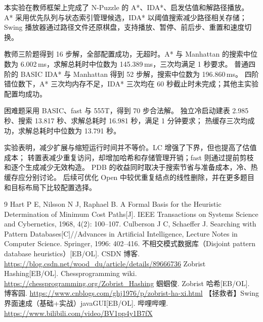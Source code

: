 \endgroup
\vspace{6bp}

\par\vspace{6bp}
\begingroup
\setlength{\parskip}{3bp}

本实验在教师框架上完成了 N-Puzzle 的 A*、IDA*、启发估值和解路径播放。
A* 采用优先队列与状态索引管理候选，IDA* 以阈值搜索减少路径相关存储；
Swing 播放器通过路径文件还原棋盘，支持播放、暂停、前后步、重置和速度切换。

教师三阶题得到 16 步解，全部配置成功，无超时。A* 与 Manhattan 的搜索中位数为
6.002\,ms，求解总耗时中位数为 145.389\,ms，三次均满足 1 秒要求。
普通四阶的 BASIC IDA* 与 Manhattan 得到 52 步解，搜索中位数为 196.860\,ms。
四阶错位数下，A* 三次均内存不足，IDA* 三次均在 60 秒截止时未完成；其他主实验配置均成功。

困难题采用 BASIC、fast 与 555T，得到 70 步合法解。
独立冷启动建表 2.985 秒、搜索 13.817 秒、求解总耗时 16.981 秒，满足 1 分钟要求；
热缓存三次均成功，求解总耗时中位数为 13.791 秒。

实验表明，减少扩展与缩短运行时间并不等价。LC 增强了下界，但也提高了估值成本；
转置表减少重复访问，却增加哈希和存储管理开销；fast 则通过提前剪枝和逐个生成减少无效构造。
PDB 的收益同时取决于搜索节省与准备成本，冷、热缓存应分别讨论。
后续可优化 Open 中较优重复结点的线性删除，并在更多题目和目标布局下比较配置选择。

\endgroup
\vspace{6bp}

\renewcommand{\refname}{参考文献}
\begin{thebibliography}{9}
 Hart P E, Nilsson N J, Raphael B. A Formal Basis for the Heuristic Determination of Minimum Cost Paths[J]. IEEE Transactions on Systems Science and Cybernetics, 1968, 4(2): 100--107.
 Culberson J C, Schaeffer J. Searching with Pattern Databases[C]//Advances in Artificial Intelligence, Lecture Notes in Computer Science. Springer, 1996: 402--416.
 不相交模式数据库（Disjoint pattern database heuristics）[EB/OL]. CSDN 博客. \url{https://blog.csdn.net/wood_du/article/details/89666736}
 Zobrist Hashing[EB/OL]. Chessprogramming wiki. \url{https://chessprogramming.org/Zobrist_Hashing}
 蝈蝈俊. Zobrist 哈希[EB/OL]. 博客园. \url{https://www.cnblogs.com/ghj1976/p/zobrist-ha-xi.html}
 【拯救者】Swing 界面速成（基础+实战）javaGUI[EB/OL]. 哔哩哔哩. \url{https://www.bilibili.com/video/BV1pp4y1B7fX}
\end{thebibliography}
